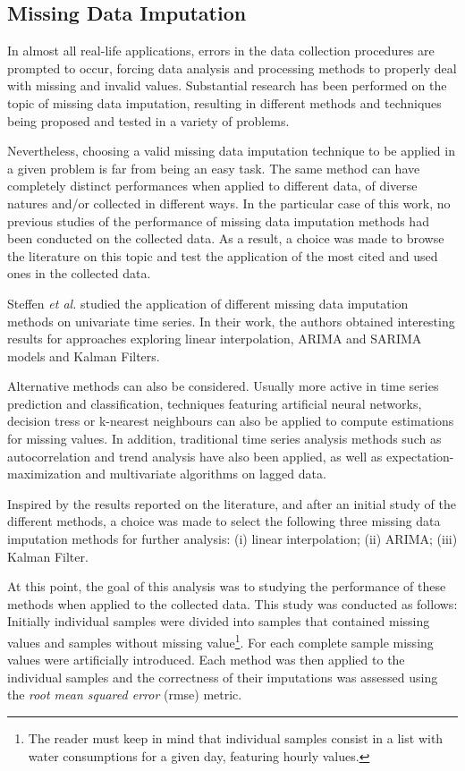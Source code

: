 \documentclass[9pt,journal,compsoc]{IEEEtran}
\begin{document}
\subsection{Missing Data Imputation}

In almost all real-life applications, errors in the data collection procedures are prompted to occur, forcing data analysis and processing methods to properly deal with missing and invalid values. Substantial research has been performed on the topic of missing data imputation, resulting in different methods and techniques being proposed and tested in a variety of problems.

Nevertheless, choosing a valid missing data imputation technique to be applied in a given problem is far from being an easy task. The same method can have completely distinct performances when applied to different data, of diverse natures and/or collected in different ways. In the particular case of this work, no previous studies of the performance of missing data imputation methods had been conducted on the collected data. As a result, a choice was made to browse the literature on this topic and test the application of the most cited and used ones in the collected data.

Steffen \emph{et al.}\cite{moritz2015comparison} studied the application of different missing data imputation methods on univariate time series. In their work, the authors obtained interesting results for approaches exploring linear interpolation, ARIMA and SARIMA models and Kalman Filters. 

Alternative methods can also be considered. Usually more active in time series prediction and classification, techniques featuring artificial neural networks, decision tress or k-nearest neighbours\cite{troyanskaya2001missing, yu2014short} can also be applied to compute estimations for missing values. In addition, traditional time series analysis methods such as autocorrelation and trend analysis have also been applied\cite{abreu2012using}, as well as expectation-maximization and multivariate algorithms on lagged data\cite{moritz2015comparison}.

Inspired by the results reported on the literature, and after an initial study of the different methods, a choice was made to select the following three missing data imputation methods for further analysis: (i) linear interpolation; (ii) ARIMA; (iii) Kalman Filter.

At this point, the goal of this analysis was to studying the performance of these methods when applied to the collected data. This study was conducted as follows: Initially individual samples were divided into samples that contained missing values and samples without missing value\footnote{The reader must keep in mind that individual samples consist in a list with water consumptions for a given day, featuring hourly values.}. For each complete sample missing values were artificially introduced. Each method was then applied to the individual samples and the correctness of their imputations was assessed using the \emph{root mean squared error} (rmse) metric.
\end{document}
